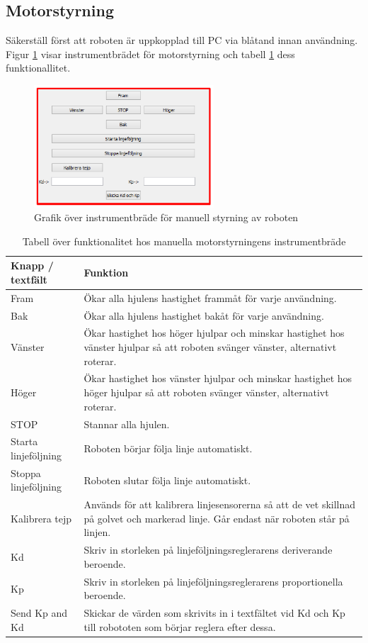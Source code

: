 \documentclass[a4paper,12pt]{article}
\begin{document}
\subsection{Motorstyrning}
\label{subsec:motor}
Säkerställ först att roboten är uppkopplad till PC via blåtand innan användning. Figur \ref{fig:pc_motor} visar instrumentbrädet för motorstyrning och tabell \ref{tab:motor} dess funktionallitet.

\begin{figure}[H]
	\centering
	\includegraphics[width=0.6\textwidth]{man_motor1.pdf}
	\caption{Grafik över instrumentbräde för manuell styrning av roboten}
	\label{fig:pc_motor}
\end{figure}

\begin{table}[H]
\centering
\begin{tabularx}{\textwidth}{|l|X|}
\hline \textbf{Knapp / textfält} & \textbf{Funktion} \\ \hline
Fram & Ökar alla hjulens hastighet frammåt för varje användning. \\ \hline
Bak & Ökar alla hjulens hastighet bakåt för varje användning. \\ \hline
Vänster & Ökar hastighet hos höger hjulpar och minskar hastighet hos vänster hjulpar så att roboten svänger vänster, alternativt roterar. \\ \hline
Höger & Ökar hastighet hos vänster hjulpar och minskar hastighet hos höger hjulpar så att roboten svänger vänster, alternativt roterar. \\ \hline
STOP & Stannar alla hjulen. \\ \hline
Starta linjeföljning & Roboten börjar följa linje automatiskt. \\ \hline
Stoppa linjeföljning & Roboten slutar följa linje automatiskt. \\ \hline
Kalibrera tejp & Används för att kalibrera linjesensorerna så att de vet skillnad på golvet och markerad linje. Går endast när roboten står på linjen. \\ \hline
Kd & Skriv in storleken på linjeföljningsreglerarens deriverande beroende. \\ \hline
Kp & Skriv in storleken på linjeföljningsreglerarens proportionella beroende. \\ \hline
Send Kp and Kd & Skickar de värden som skrivits in i textfältet vid Kd och Kp till robototen som börjar reglera efter dessa. \\ \hline

\end{tabularx}
\caption{Tabell över funktionalitet hos manuella motorstyrningens instrumentbräde}
\label{tab:motor}
\end{table}
\end{document}
